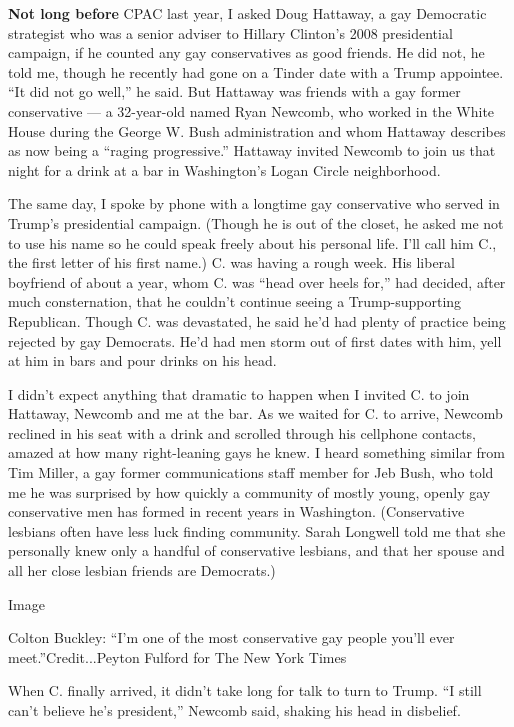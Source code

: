\textbf{Not long before} CPAC last year, I asked Doug Hattaway, a gay
Democratic strategist who was a senior adviser to Hillary Clinton's 2008
presidential campaign, if he counted any gay conservatives as good
friends. He did not, he told me, though he recently had gone on a Tinder
date with a Trump appointee. ``It did not go well,'' he said. But
Hattaway was friends with a gay former conservative --- a 32-year-old
named Ryan Newcomb, who worked in the White House during the George W.
Bush administration and whom Hattaway describes as now being a ``raging
progressive.'' Hattaway invited Newcomb to join us that night for a
drink at a bar in Washington's Logan Circle neighborhood.

The same day, I spoke by phone with a longtime gay conservative who
served in Trump's presidential campaign. (Though he is out of the
closet, he asked me not to use his name so he could speak freely about
his personal life. I'll call him C., the first letter of his first
name.) C. was having a rough week. His liberal boyfriend of about a
year, whom C. was ``head over heels for,'' had decided, after much
consternation, that he couldn't continue seeing a Trump-supporting
Republican. Though C. was devastated, he said he'd had plenty of
practice being rejected by gay Democrats. He'd had men storm out of
first dates with him, yell at him in bars and pour drinks on his head.

I didn't expect anything that dramatic to happen when I invited C. to
join Hattaway, Newcomb and me at the bar. As we waited for C. to arrive,
Newcomb reclined in his seat with a drink and scrolled through his
cellphone contacts, amazed at how many right-leaning gays he knew. I
heard something similar from Tim Miller, a gay former communications
staff member for Jeb Bush, who told me he was surprised by how quickly a
community of mostly young, openly gay conservative men has formed in
recent years in Washington. (Conservative lesbians often have less luck
finding community. Sarah Longwell told me that she personally knew only
a handful of conservative lesbians, and that her spouse and all her
close lesbian friends are Democrats.)

Image

Colton Buckley: ``I'm one of the most conservative gay people you'll
ever meet.''Credit...Peyton Fulford for The New York Times

When C. finally arrived, it didn't take long for talk to turn to Trump.
``I still can't believe he's president,'' Newcomb said, shaking his head
in disbelief.

